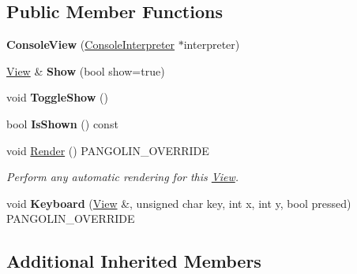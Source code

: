 \subsection*{Public Member Functions}
\begin{DoxyCompactItemize}
\item 
{\bfseries Console\+View} (\hyperlink{classpangolin_1_1_console_interpreter}{Console\+Interpreter} $\ast$interpreter)\hypertarget{classpangolin_1_1_console_view_a699259931f9e06c42c483abd9b1d1fce}{}\label{classpangolin_1_1_console_view_a699259931f9e06c42c483abd9b1d1fce}

\item 
\hyperlink{structpangolin_1_1_view}{View} \& {\bfseries Show} (bool show=true)\hypertarget{classpangolin_1_1_console_view_a3c0b4f5f43fe090758bda243c980b188}{}\label{classpangolin_1_1_console_view_a3c0b4f5f43fe090758bda243c980b188}

\item 
void {\bfseries Toggle\+Show} ()\hypertarget{classpangolin_1_1_console_view_a8546a64ea3592ddd39c5fbcc62ac2a7d}{}\label{classpangolin_1_1_console_view_a8546a64ea3592ddd39c5fbcc62ac2a7d}

\item 
bool {\bfseries Is\+Shown} () const \hypertarget{classpangolin_1_1_console_view_a098860c962a94c6e95331087c31dc4c5}{}\label{classpangolin_1_1_console_view_a098860c962a94c6e95331087c31dc4c5}

\item 
void \hyperlink{classpangolin_1_1_console_view_aca9edf0d08cfc5bb028464379797a908}{Render} () P\+A\+N\+G\+O\+L\+I\+N\+\_\+\+O\+V\+E\+R\+R\+I\+DE
\begin{DoxyCompactList}\small\item\em Perform any automatic rendering for this \hyperlink{structpangolin_1_1_view}{View}. \end{DoxyCompactList}\item 
void {\bfseries Keyboard} (\hyperlink{structpangolin_1_1_view}{View} \&, unsigned char key, int x, int y, bool pressed) P\+A\+N\+G\+O\+L\+I\+N\+\_\+\+O\+V\+E\+R\+R\+I\+DE\hypertarget{classpangolin_1_1_console_view_abbc01c957ef410d5c788d0d146cace79}{}\label{classpangolin_1_1_console_view_abbc01c957ef410d5c788d0d146cace79}

\end{DoxyCompactItemize}
\subsection*{Additional Inherited Members}



